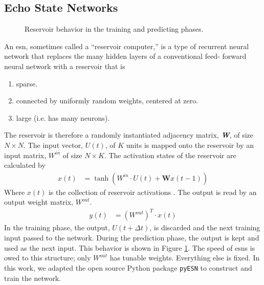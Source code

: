 \subsection{Echo State Networks}

\begin{figure}[htp]
  \centering


  \caption{Reservoir behavior in the training and predicting phases.}
  \label{fig:reservoir_graph}
\end{figure}

An \gls{esn}, sometimes called a ``reservoir computer,''\cite{pathak_using_2017, pathak_model-free_2018, vlachas_backpropagation_2020} is a type of recurrent
neural network that replaces the many hidden layers of a conventional feed-
forward neural network with a reservoir that is
\begin{enumerate}
  \item sparse.
  \item connected by uniformly random weights, centered at zero.
  \item large (i.e. has many neurons).
\end{enumerate}

The reservoir is therefore a randomly instantiated adjacency matrix,
\textit{\textbf{W}}, of size $N \times N$. The input vector, $U(t)$, of
$K$ units is mapped onto the reservoir by an input matrix,
 $W^{in}$ of size $N \times K$. The activation states of the reservoir are calculated by
 \begin{align}
   x(t) &= \tanh \left(W^{in}\cdot U(t) + \mathbf{W}x(t-1)\right)
 \end{align}
 Where $x(t)$ is the collection of reservoir activations \cite{shi_energy_2016, pathak_model-free_2018, lukosevicius_practical_2012}.
 The output is read by an output weight matrix,
 $W^{out}$.
 \begin{align}
   y(t) &= \left(W^{out}\right)^T\cdot x(t)
 \end{align}
 In the training phase, the output, $U(t+\Delta t)$, is
 discarded and the next training input passed to the network. During the
 prediction phase, the output is kept and used as the next input. This behavior
 is shown in Figure \ref{fig:reservoir_graph}. The speed of \glspl{esn} is owed
 to this structure; only $W^{out}$ has tunable weights. Everything else is
 fixed. In this work, we adapted the open source Python package \texttt{pyESN} \cite{korndorfer_pyesn_2015} to construct and train the network.

